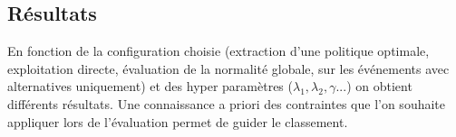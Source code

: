 



\subsection{Résultats}

En fonction de la configuration choisie (extraction d'une politique optimale, exploitation directe, évaluation de la normalité globale, sur les événements avec alternatives uniquement) et des hyper paramètres ($\lambda_1,\lambda_2, \gamma$...) on obtient différents résultats. Une connaissance a priori des contraintes que l'on souhaite appliquer lors de l'évaluation permet de guider le classement. 


